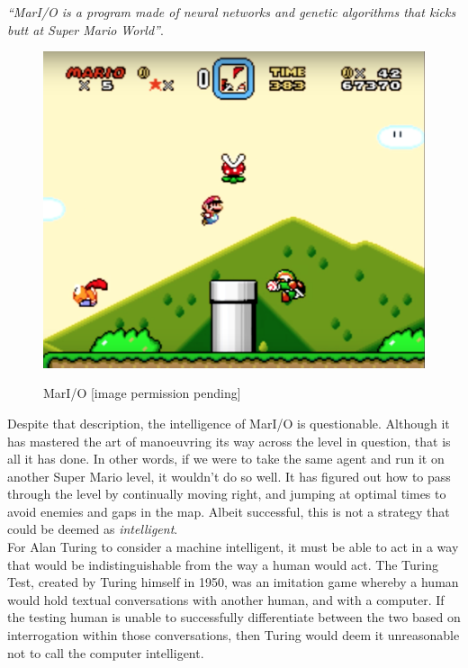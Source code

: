 \documentclass[12pt,a4paper]{article}
\begin{document}
\textit{\enquote{MarI/O is a program made of neural networks and genetic algorithms that kicks butt at Super Mario World}}\citep{MarIO}.\\

\begin{figure}[h]
	\centering
	\includegraphics[width = \textwidth]{MarIO.png}
	\caption{MarI/O [image permission pending]}
	\citep{MarIO} 
\end{figure}

Despite that description, the intelligence of MarI/O is questionable. Although it has mastered the art of manoeuvring its way across the level in question, that is all it has done. In other words, if we were to take the same agent and run it on another Super Mario level, it wouldn't do so well. It has figured out how to pass through the level by continually moving right, and jumping at optimal times to avoid enemies and gaps in the map. Albeit successful, this is not a strategy that could be deemed as \textit{intelligent}.\\

For Alan Turing to consider a machine intelligent, it must be able to act in a way that would be indistinguishable from the way a human would act. The Turing Test, created by Turing himself in 1950, was an imitation game whereby a human would hold textual conversations with another human, and with a computer. If the testing human is unable to successfully differentiate between the two based on interrogation within those conversations, then Turing would deem it unreasonable not to call the computer intelligent\citep{TuringTest}.\\
\end{document}
